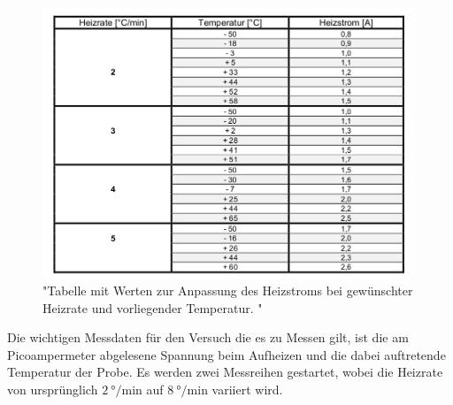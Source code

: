 \begin{figure}
    \centering
    \includegraphics[width=0.99\textwidth]{bilder/tabelle.png}
    \caption{"Tabelle mit Werten zur Anpassung des Heizstroms bei gewünschter Heizrate und vorliegender Temperatur.
            \cite{skript}"}
    \label{fig:tabelle}
\end{figure}

Die wichtigen Messdaten für den Versuch die es zu Messen gilt, ist die am Picoampermeter 
abgelesene Spannung beim Aufheizen und die dabei auftretende Temperatur der Probe.
Es werden zwei Messreihen gestartet, wobei die Heizrate von ursprünglich $\SI{2}{\degree\per\minute}$
auf $\SI{8}{\degree\per\minute}$ variiert wird.